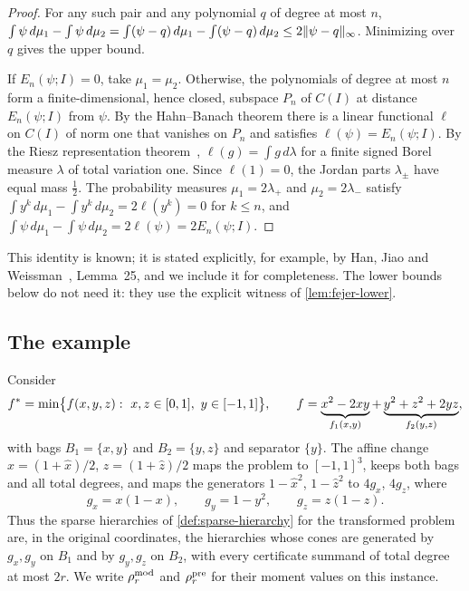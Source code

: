\begin{proof}
For any such pair and any polynomial $q$ of degree at most $n$,
$\int\psi\,d\mu_1-\int\psi\,d\mu_2=\int(\psi-q)\,d\mu_1-\int(\psi-q)\,d\mu_2
\le2\lVert \psi-q\rVert_\infty$. Minimizing over $q$ gives the upper bound.

If $E_n(\psi;I)=0$, take $\mu_1=\mu_2$. Otherwise, the polynomials of
degree at most $n$ form a finite-dimensional, hence closed, subspace $P_n$
of $C(I)$ at distance $E_n(\psi;I)$ from $\psi$. By the Hahn--Banach
theorem there is a linear functional $\ell$ on $C(I)$ of norm one that
vanishes on $P_n$ and satisfies $\ell(\psi)=E_n(\psi;I)$. By the Riesz
representation theorem~\cite{rudin1987-real-complex-analysis},
$\ell(g)=\int g\,d\lambda$ for a finite signed Borel measure $\lambda$ of
total variation one. Since $\ell(1)=0$, the Jordan parts $\lambda_\pm$ have
equal mass $\frac12$. The probability measures $\mu_1=2\lambda_+$ and
$\mu_2=2\lambda_-$ satisfy $\int y^k\,d\mu_1-\int y^k\,d\mu_2=2\ell(y^k)=0$
for $k\le n$, and $\int\psi\,d\mu_1-\int\psi\,d\mu_2=2\ell(\psi)=
2E_n(\psi;I)$.
\end{proof}

This identity is known; it is stated explicitly, for example, by Han, Jiao
and Weissman~\cite{han2018-local-moment-matching}, Lemma~25, and we include
it for completeness. The lower bounds below do not need it: they use the
explicit witness of \cref{lem:fejer-lower}.

\subsection{The example}\label{sec:shp-example}

Consider
\begin{equation}\label{eq:shp-problem}
  f^{*}=\min\bigl\{f(x,y,z):\ x,z\in[0,1],\ y\in[-1,1]\bigr\},\qquad
  f=\underbrace{x^2-2xy}_{f_1(x,y)}
   +\underbrace{y^2+z^2+2yz}_{f_2(y,z)},
\end{equation}
with bags $B_1=\{x,y\}$ and $B_2=\{y,z\}$ and separator $\{y\}$. The
affine change $x=(1+\hat x)/2$, $z=(1+\hat z)/2$ maps the problem to
$[-1,1]^3$, keeps both bags and all total degrees, and maps the generators
$1-\hat x^2$, $1-\hat z^2$ to $4g_x$, $4g_z$, where
\[
  g_x=x(1-x),\qquad g_y=1-y^2,\qquad g_z=z(1-z).
\]
Thus the sparse hierarchies of \cref{def:sparse-hierarchy} for the
transformed problem are, in the original coordinates, the hierarchies whose
cones are generated by $g_x,g_y$ on $B_1$ and by $g_y,g_z$ on $B_2$, with
every certificate summand of total degree at most $2r$. We write
$\rho^{\mathrm{mod}}_r$ and $\rho^{\mathrm{pre}}_r$ for their moment values on this instance.

